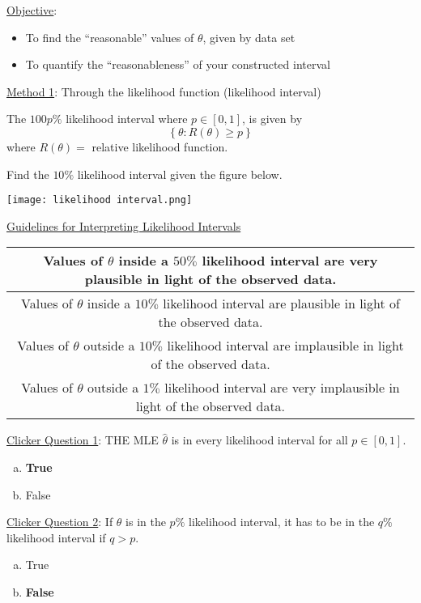 \underline{Objective}:
\begin{itemize}
    \item To find the ``reasonable'' values of $ \theta $, given by data set
    \item To quantify the ``reasonableness'' of your constructed interval
\end{itemize}
\underline{Method 1}: Through the likelihood function (likelihood interval)
\begin{defbox}
    \begin{definition}
        The $ 100p\% $ likelihood interval where $ p\in[0,1] $, is given by
        \[ \left\{ \theta:R(\theta)\geqslant p\right\} \]
        where $ R(\theta)= $ relative likelihood function.
    \end{definition}
\end{defbox}
\begin{exbox}
    \begin{example}
        Find the $ 10\% $ likelihood interval given the figure below.
        \begin{center}
            \texttt{[image: likelihood interval.png]}
        \end{center}
    \end{example}
\end{exbox}
\begin{center}
    \underline{Guidelines for Interpreting Likelihood Intervals}
\end{center}
\begin{center}
    \begin{tabular}{|c|}
        \hline
        Values of $ \theta $ inside a $ 50\% $ likelihood interval are very plausible in light of
        the observed data. \\
        \hline
        Values of $ \theta $ inside a $ 10\% $ likelihood interval are plausible in light of
        the observed data. \\
        \hline
        Values of $ \theta $ outside a $ 10\% $ likelihood interval are implausible in light of
        the observed data. \\
        \hline
        Values of $ \theta $ outside a $ 1\% $ likelihood interval are very implausible in light of
        the observed data. \\
        \hline
    \end{tabular}
\end{center}
\underline{Clicker Question 1}: THE MLE $ \hat{\theta} $ is in every likelihood
interval for all $ p\in[0,1] $.
\begin{enumerate}[(a)]
    \item \textbf{True}
    \item False
\end{enumerate}
\underline{Clicker Question 2}: If $ \theta $ is in the $ p\% $ likelihood
interval, it has to be in the $ q\% $ likelihood interval if $ q>p $.
\begin{enumerate}[(a)]
    \item True
    \item \textbf{False}
\end{enumerate}
